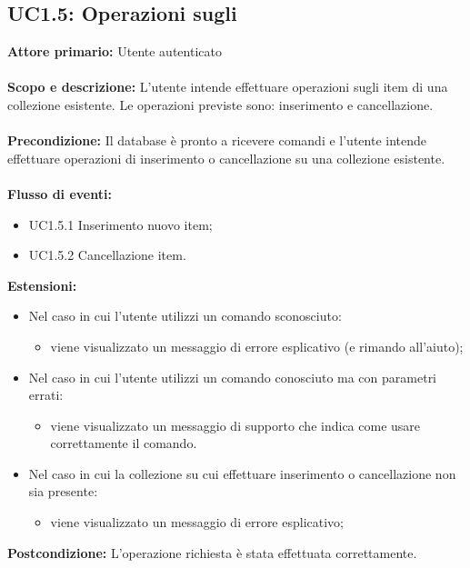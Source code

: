 \documentclass{scalatekids-article}
\begin{document}
\subsection{UC1.5: Operazioni sugli }
\textbf{Attore primario:} Utente autenticato\\ \\
\textbf{Scopo e descrizione:} L'utente intende effettuare operazioni sugli item di una collezione esistente. Le operazioni previste sono:
inserimento e cancellazione.\\ \\
\textbf{Precondizione:} Il database è pronto a ricevere comandi e l'utente intende effettuare operazioni di inserimento o cancellazione su una collezione esistente.\\ \\
\textbf{Flusso di eventi:}
\begin{itemize}
\item UC1.5.1 Inserimento nuovo item;
\item UC1.5.2 Cancellazione item.
\end{itemize}
\textbf{Estensioni:}
\begin{itemize}
\item Nel caso in cui l'utente utilizzi un comando sconosciuto:
  \begin{itemize}
  \item viene visualizzato un messaggio di errore esplicativo (e rimando all'aiuto);
  \end{itemize}
\item Nel caso in cui l'utente utilizzi un comando conosciuto ma con parametri errati:
  \begin{itemize}
  \item viene visualizzato un messaggio di supporto che indica come usare correttamente il comando.
  \end{itemize}
\item Nel caso in cui la collezione su cui effettuare inserimento o cancellazione non sia presente:
  \begin{itemize}
  \item viene visualizzato un messaggio di errore esplicativo;
  \end{itemize}
\end{itemize}
\textbf{Postcondizione:} L'operazione richiesta è stata effettuata correttamente.
\end{document}
